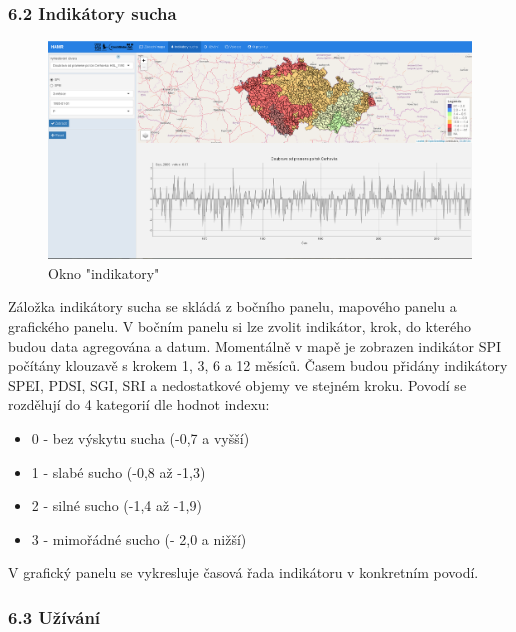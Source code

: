 \documentclass[12pt,]{article}
\providecommand{\tightlist}{%
  \setlength{\itemsep}{0pt}\setlength{\parskip}{0pt}}
\begin{document}
\subsubsection{6.2 Indikátory sucha}\label{indikatory-sucha}

\begin{figure}[H]
      \includegraphics[width=\textwidth]{fig/P_indikatory}
      \caption{Okno "indikatory"}
      \label{fig2}
\end{figure}

Záložka indikátory sucha se skládá z bočního panelu, mapového panelu a
grafického panelu. V bočním panelu si lze zvolit indikátor, krok, do
kterého budou data agregována a datum. Momentálně v mapě je zobrazen
indikátor SPI počítány klouzavě s krokem 1, 3, 6 a 12 měsíců. Časem
budou přidány indikátory SPEI, PDSI, SGI, SRI a nedostatkové objemy ve
stejném kroku. Povodí se rozdělují do 4 kategorií dle hodnot indexu:

\begin{itemize}
\tightlist
\item
  0 - bez výskytu sucha (-0,7 a vyšší)
\item
  1 - slabé sucho (-0,8 až -1,3)
\item
  2 - silné sucho (-1,4 až -1,9)
\item
  3 - mimořádné sucho (- 2,0 a nižší)
\end{itemize}

V grafický panelu se vykresluje časová řada indikátoru v konkretním
povodí.

\subsubsection{6.3 Užívání}\label{uzivani}
\end{document}
